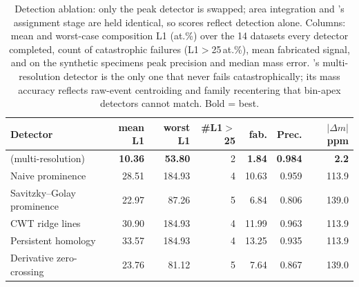 \begin{table}[t]
\centering
\caption{Detection ablation: only the peak detector is swapped; area
integration and \rf{}'s assignment stage are held identical, so scores
reflect detection alone. Columns: mean and worst-case composition L1
(at.\%) over the 14 datasets every detector completed, count of
catastrophic failures (L1$>$25\,at.\%), mean fabricated signal, and on
the synthetic specimens peak precision and median mass error. \rf{}'s
multi-resolution detector is the only one that never fails
catastrophically; its mass accuracy reflects raw-event centroiding and
family recentering that bin-apex detectors cannot match. Bold = best.}
\label{tab:detection_ablation}
\small
\begin{tabular}{lrrrrrr}
\toprule
Detector & mean L1 & worst L1 & \#L1$>$25 & fab. & Prec. & $|\Delta m|$ ppm \\
\midrule
\rf{} (multi-resolution) & \textbf{10.36} & \textbf{53.80} & 2 & \textbf{1.84} & \textbf{0.984} & \textbf{2.2} \\
Naive prominence & 28.51 & 184.93 & 4 & 10.63 & 0.959 & 113.9 \\
Savitzky--Golay prominence & 22.97 & 87.26 & 5 & 6.84 & 0.806 & 139.0 \\
CWT ridge lines & 30.90 & 184.93 & 4 & 11.99 & 0.963 & 113.9 \\
Persistent homology & 33.57 & 184.93 & 4 & 13.25 & 0.935 & 113.9 \\
Derivative zero-crossing & 23.76 & 81.12 & 5 & 7.64 & 0.867 & 139.0 \\
\bottomrule
\end{tabular}
\end{table}
